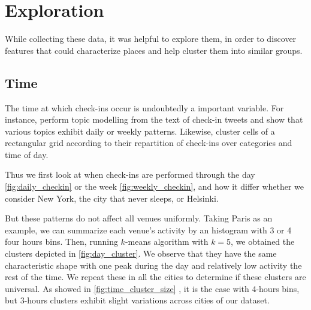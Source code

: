 \section{Exploration}
\label{sec:exploration}

While collecting these data, it was helpful to explore them, in order to
discover features that could characterize places and help cluster them into
similar groups.

\subsection{Time}

The time at which check-ins occur is undoubtedly a important variable. For
instance, \textcite{UrbanStory12} perform topic modelling from the text of
check-in tweets and show that various topics exhibit daily or weekly
patterns. Likewise, \textcite{TimeCluster13} cluster cells of a rectangular
grid according to their repartition of check-ins over categories and time of
day.

Thus we first look at when check-ins are performed through the day
\autoref{fig:daily_checkin} or the week \autoref{fig:weekly_checkin}, and how it
differ whether we consider New York, the city that never sleeps, or Helsinki.

But these patterns do not affect all venues uniformly. Taking Paris as an
example, we can summarize each venue's activity by an histogram with 3 or 4
four hours bins. Then, running $k$-means algorithm with $k=5$, we obtained the
clusters depicted in \autoref{fig:day_cluster}. We observe that they have the
same characteristic shape with one peak during the day and relatively low
activity the rest of the time. We repeat these in all the cities to determine
if these clusters are universal. As showed in \autoref{fig:time_cluster_size}
, it is the case with 4-hours bins, but
3-hours clusters exhibit slight variations across cities of our dataset.


